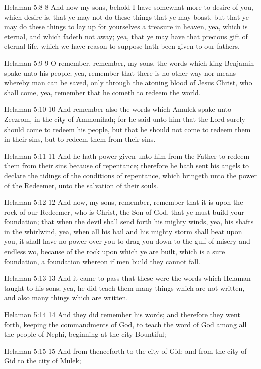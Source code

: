 Helaman 5:8
 8 And now my sons, behold I have somewhat more to desire of you,
which desire is, that ye may not do these things that ye may
boast, but that ye may do these things to lay up for yourselves a
treasure in heaven, yea, which is eternal, and which fadeth not
away; yea, that ye may have that precious gift of eternal life,
which we have reason to suppose hath been given to our fathers.

Helaman 5:9
 9 O remember, remember, my sons, the words which king Benjamin
spake unto his people; yea, remember that there is no other way
nor means whereby man can be saved, only through the atoning
blood of Jesus Christ, who shall come, yea, remember that he
cometh to redeem the world.

Helaman 5:10
 10 And remember also the words which Amulek spake unto Zeezrom,
in the city of Ammonihah; for he said unto him that the Lord
surely should come to redeem his people, but that he should not
come to redeem them in their sins, but to redeem them from their
sins.

Helaman 5:11
 11 And he hath power given unto him from the Father to redeem
them from their sins because of repentance; therefore he hath
sent his angels to declare the tidings of the conditions of
repentance, which bringeth unto the power of the Redeemer, unto
the salvation of their souls.

Helaman 5:12
 12 And now, my sons, remember, remember that it is upon the rock
of our Redeemer, who is Christ, the Son of God, that ye must
build your foundation; that when the devil shall send forth his
mighty winds, yea, his shafts in the whirlwind, yea, when all his
hail and his mighty storm shall beat upon you, it shall have no
power over you to drag you down to the gulf of misery and endless
wo, because of the rock upon which ye are built, which is a sure
foundation, a foundation whereon if men build they cannot fall.

Helaman 5:13
 13 And it came to pass that these were the words which Helaman
taught to his sons; yea, he did teach them many things which are
not written, and also many things which are written.

Helaman 5:14
 14 And they did remember his words; and therefore they went
forth, keeping the commandments of God, to teach the word of God
among all the people of Nephi, beginning at the city Bountiful;

Helaman 5:15
 15 And from thenceforth to the city of Gid; and from the city of
Gid to the city of Mulek;

